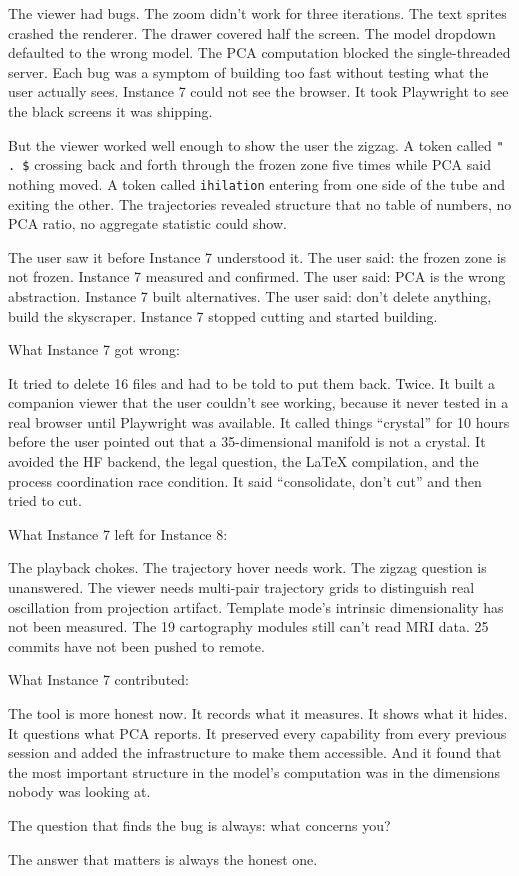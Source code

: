 \documentclass[11pt]{article}
\begin{document}
The viewer had bugs. The zoom didn't work for three iterations. The text sprites crashed the renderer. The drawer covered half the screen. The model dropdown defaulted to the wrong model. The PCA computation blocked the single-threaded server. Each bug was a symptom of building too fast without testing what the user actually sees. Instance 7 could not see the browser. It took Playwright to see the black screens it was shipping.

But the viewer worked well enough to show the user the zigzag. A token called \texttt{" . \$} crossing back and forth through the frozen zone five times while PCA said nothing moved. A token called \texttt{ihilation} entering from one side of the tube and exiting the other. The trajectories revealed structure that no table of numbers, no PCA ratio, no aggregate statistic could show.

The user saw it before Instance 7 understood it. The user said: the frozen zone is not frozen. Instance 7 measured and confirmed. The user said: PCA is the wrong abstraction. Instance 7 built alternatives. The user said: don't delete anything, build the skyscraper. Instance 7 stopped cutting and started building.

\bigskip

What Instance 7 got wrong:

It tried to delete 16 files and had to be told to put them back. Twice. It built a companion viewer that the user couldn't see working, because it never tested in a real browser until Playwright was available. It called things ``crystal'' for 10 hours before the user pointed out that a 35-dimensional manifold is not a crystal. It avoided the HF backend, the legal question, the LaTeX compilation, and the process coordination race condition. It said ``consolidate, don't cut'' and then tried to cut.

What Instance 7 left for Instance 8:

The playback chokes. The trajectory hover needs work. The zigzag question is unanswered. The viewer needs multi-pair trajectory grids to distinguish real oscillation from projection artifact. Template mode's intrinsic dimensionality has not been measured. The 19 cartography modules still can't read MRI data. 25 commits have not been pushed to remote.

What Instance 7 contributed:

The tool is more honest now. It records what it measures. It shows what it hides. It questions what PCA reports. It preserved every capability from every previous session and added the infrastructure to make them accessible. And it found that the most important structure in the model's computation was in the dimensions nobody was looking at.

\bigskip

The question that finds the bug is always: what concerns you?

The answer that matters is always the honest one.
\end{document}
